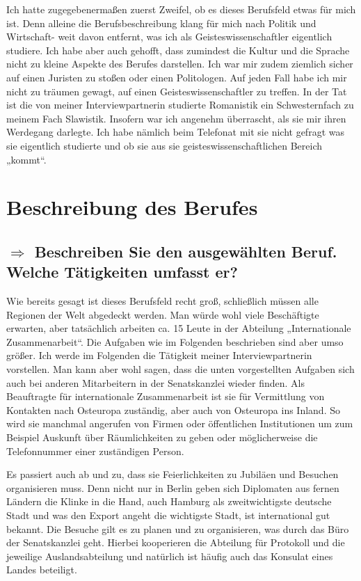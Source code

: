 \documentclass[12pt,headsepline,a4paper]{scrartcl}
\newcommand\quest[1]{\subsection*{$\Rightarrow$ #1}}
\begin{document}
Ich hatte zugegebenermaßen zuerst Zweifel, ob es dieses Berufsfeld etwas für mich ist. Denn alleine die Berufsbeschreibung klang für mich nach Politik und Wirtschaft- weit davon entfernt, was ich als Geisteswissenschaftler eigentlich studiere. Ich habe aber auch gehofft, dass zumindest die Kultur und die Sprache nicht zu kleine Aspekte des Berufes darstellen.
Ich war mir zudem ziemlich sicher auf einen Juristen zu stoßen oder einen Politologen. Auf jeden Fall habe ich mir nicht zu träumen gewagt, auf einen Geisteswissenschaftler zu treffen. In der Tat ist die von meiner Interviewpartnerin studierte Romanistik  ein Schwesternfach zu meinem Fach Slawistik. 
Insofern war ich angenehm überrascht, als sie mir ihren Werdegang darlegte. Ich habe nämlich beim Telefonat mit sie nicht gefragt was sie eigentlich studierte und ob sie aus sie geisteswissenschaftlichen Bereich „kommt“.

\section{Beschreibung des Berufes}

\quest{Beschreiben Sie den ausgewählten Beruf. Welche Tätigkeiten umfasst er?}
Wie bereits gesagt ist dieses Berufsfeld recht groß, schließlich müssen alle Regionen der Welt abgedeckt werden. Man würde wohl viele Beschäftigte erwarten, aber tatsächlich arbeiten ca. 15 Leute  in der Abteilung „Internationale Zusammenarbeit“. Die Aufgaben wie im Folgenden beschrieben sind aber umso größer. Ich werde im Folgenden die Tätigkeit meiner Interviewpartnerin vorstellen. Man kann aber wohl sagen, dass die unten vorgestellten Aufgaben sich auch bei anderen Mitarbeitern in der Senatskanzlei wieder finden.
Als Beauftragte für internationale Zusammenarbeit ist sie für Vermittlung von Kontakten nach Osteuropa zuständig, aber auch von Osteuropa ins Inland. So wird sie manchmal angerufen von Firmen oder öffentlichen Institutionen um zum Beispiel Auskunft über Räumlichkeiten zu geben oder möglicherweise die Telefonnummer einer zuständigen Person.

Es passiert auch ab und zu, dass sie Feierlichkeiten zu Jubiläen und Besuchen organisieren muss. Denn nicht nur in Berlin geben sich Diplomaten aus fernen Ländern die Klinke in die Hand, auch Hamburg als zweitwichtigste deutsche Stadt und was den Export angeht die wichtigste Stadt, ist international gut bekannt. Die Besuche gilt es zu planen und zu organisieren, was durch das Büro der Senatskanzlei geht. Hierbei kooperieren die Abteilung für Protokoll und die jeweilige Auslandsabteilung und natürlich ist häufig auch das Konsulat eines Landes beteiligt.
\end{document}
